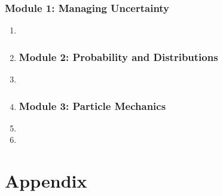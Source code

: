 \documentclass[fleqn,titlepage]{book}
\theoremstyle{plain}
\theoremstyle{definition}
\theoremstyle{remark}
\numberwithin{equation}{section}
\begin{document}
\section{Module 1: Managing Uncertainty}
\begin{enumerate}[label=\bfseries  \arabic*.]\setcounter{enumi}{0}
\item 
\item 
\section{Module 2: Probability and Distributions}
\item 
\item %
\section{Module 3: Particle Mechanics}
\item %
\item %
\end{enumerate}


\part{Appendix}
\end{document}
